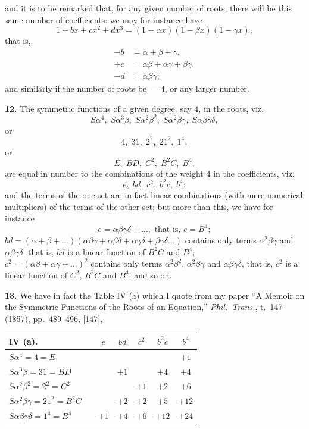 \documentclass[11pt]{article}
\begin{document}
and it is to be remarked that, for any given number of roots, there will be this same number of coefficients: we may for instance have
\[
1 + bx + cx^2 + dx^3 = (1 - \alpha x)(1 - \beta x)(1 - \gamma x),
\]
that is,
\begin{align*}
-b &= \alpha + \beta + \gamma,\\
+c &= \alpha\beta + \alpha\gamma + \beta\gamma,\\
-d &= \alpha\beta\gamma;
\end{align*}
and similarly if the number of roots be $= 4$, or any larger number.

\textbf{12.} The symmetric functions of a given degree, say $4$, in the roots, viz.
\[
S\alpha^4,\; S\alpha^3\beta,\; S\alpha^2\beta^2,\; S\alpha^2\beta\gamma,\; S\alpha\beta\gamma\delta,
\]
or
\[
4,\; 31,\; 2^2,\; 21^2,\; 1^4,
\]
or
\[
E,\; BD,\; C^2,\; B^2 C,\; B^4,
\]
are equal in number to the combinations of the weight $4$ in the coefficients, viz.
\[
e,\; bd,\; c^2,\; b^2 c,\; b^4;
\]
and the terms of the one set are in fact linear combinations (with mere numerical multipliers) of the terms of the other set; but more than this, we have for instance
\[
e = \alpha\beta\gamma\delta + \ldots, \text{ that is, } e = B^4;
\]
$bd = (\alpha + \beta + \ldots)(\alpha\beta\gamma + \alpha\beta\delta + \alpha\gamma\delta + \beta\gamma\delta\ldots)$ contains only terms $\alpha^2\beta\gamma$ and $\alpha\beta\gamma\delta$, that is, $bd$ is a linear function of $B^2 C$ and $B^4$;\\
$c^2 = (\alpha\beta + \alpha\gamma + \ldots)^2$ contains only terms $\alpha^2\beta^2$, $\alpha^2\beta\gamma$ and $\alpha\beta\gamma\delta$, that is, $c^2$ is a linear function of $C^2$, $B^2 C$ and $B^4$; and so on.

\textbf{13.} We have in fact the Table IV (a) which I quote from my paper ``A Memoir on the Symmetric Functions of the Roots of an Equation,'' \textit{Phil.\ Trans.}, t.\ \textsc{147} (1857), pp.\ 489--496, [147],

\begin{center}
\begin{tabular}{l|cccccc}
IV (a). & & $e$ & $bd$ & $c^2$ & $b^2 c$ & $b^4$ \\
\hline
$S\alpha^4 = 4 = E$ & & & & & & $+1$ \\
$S\alpha^3\beta = 31 = BD$ & & & $+1$ & & $+4$ & $+4$ \\
$S\alpha^2\beta^2 = 2^2 = C^2$ & & & & $+1$ & $+2$ & $+6$ \\
$S\alpha^2\beta\gamma = 21^2 = B^2 C$ & & & $+2$ & $+2$ & $+5$ & $+12$ \\
$S\alpha\beta\gamma\delta = 1^4 = B^4$ & & $+1$ & $+4$ & $+6$ & $+12$ & $+24$ \\
\end{tabular}
\end{center}
\end{document}
